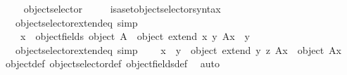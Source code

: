 \begin{isabellebody}
\ \ \ \isamarkupfalse%
\ object{\isacharunderscore}{\kern0pt}selector\ {\isacharparenleft}{\kern0pt}{\isachardoublequoteopen}{\isacharunderscore}{\kern0pt}{\isacharat}{\kern0pt}{\isacharunderscore}{\kern0pt}{\isachardoublequoteclose}\ {\isacharbrackleft}{\kern0pt}{}{}{}{\isacharcomma}{\kern0pt}\ {}{}{}{}{\isacharbrackright}{\kern0pt}{\isacharparenright}{\kern0pt}\ \isamarkupfalse%
\isanewline
\isanewline
{}\isamarkupfalse%
\ isa{\isacharunderscore}{\kern0pt}set{\isacharunderscore}{\kern0pt}object{\isacharunderscore}{\kern0pt}selector{\isacharunderscore}{\kern0pt}syntax\isanewline
\isanewline
{}\isamarkupfalse%
\isanewline
\ \ \ object{\isacharunderscore}{\kern0pt}selector{\isacharunderscore}{\kern0pt}extend{\isacharunderscore}{\kern0pt}eq\ {\isacharbrackleft}{\kern0pt}simp{\isacharbrackright}{\kern0pt}{\isacharcolon}{\kern0pt}\isanewline
\ \ \ \ {\isachardoublequoteopen}x\ {\isasymnotin}\ object{\isacharunderscore}{\kern0pt}fields\ {\isacharparenleft}{\kern0pt}object\ A{\isacharparenright}{\kern0pt}\ {\isasymLongrightarrow}\ {\isacharparenleft}{\kern0pt}object\ {\isacharparenleft}{\kern0pt}extend\ x\ y\ A{\isacharparenright}{\kern0pt}{\isacharparenright}{\kern0pt}{\isacharat}{\kern0pt}x\ {\isacharequal}{\kern0pt}\ y{\isachardoublequoteclose}\isanewline
\ \ \ object{\isacharunderscore}{\kern0pt}selector{\isacharunderscore}{\kern0pt}extend{\isacharunderscore}{\kern0pt}eq{\isacharprime}{\kern0pt}\ {\isacharbrackleft}{\kern0pt}simp{\isacharbrackright}{\kern0pt}{\isacharcolon}{\kern0pt}\isanewline
\ \ \ \ {\isachardoublequoteopen}x\ {\isasymnoteq}\ y\ {\isasymLongrightarrow}\ {\isacharparenleft}{\kern0pt}object\ {\isacharparenleft}{\kern0pt}extend\ y\ z\ A{\isacharparenright}{\kern0pt}{\isacharparenright}{\kern0pt}{\isacharat}{\kern0pt}x\ {\isacharequal}{\kern0pt}\ {\isacharparenleft}{\kern0pt}object\ A{\isacharparenright}{\kern0pt}{\isacharat}{\kern0pt}x{\isachardoublequoteclose}\isanewline
%
\isadelimproof
\ \ %
\endisadelimproof
%
\isatagproof
{}\isamarkupfalse%
\ object{\isacharunderscore}{\kern0pt}def\ object{\isacharunderscore}{\kern0pt}selector{\isacharunderscore}{\kern0pt}def\ object{\isacharunderscore}{\kern0pt}fields{\isacharunderscore}{\kern0pt}def\ \isamarkupfalse%
\ auto%
\endisatagproof
{\isafoldproof}%
%
\isadelimproof
\isanewline
%
\endisadelimproof
\isanewline
\isanewline
\isanewline
\isanewline
%
\isadelimtheory
\isanewline
%
\endisadelimtheory
%
\isatagtheory
{}\isamarkupfalse%
%
\endisatagtheory
{\isafoldtheory}%
%
\isadelimtheory
%
\endisadelimtheory
%
\end{isabellebody}%
